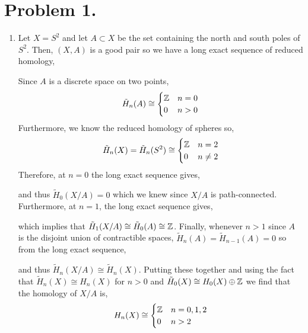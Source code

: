 \documentclass[12pt]{extarticle}
\begin{document}

\section*{Problem 1.}

\begin{enumerate}
\item Let $X = S^2$ and let $A \subset X$ be the set containing the north and south poles of $S^2$. Then, $(X, A)$ is a good pair so we  have a long exact sequence of reduced homology,
\begin{center}
\end{center} 
Since $A$ is a discrete space on two points, 
\[ \tilde{H}_n(A) \cong 
\begin{cases}
\mathbb{Z} & n = 0
\\
0 & n > 0
\end{cases} \]
Furthermore, we know the reduced homology of spheres so,
\[ \tilde{H}_n(X) = \tilde{H}_n(S^2) \cong 
\begin{cases}
\mathbb{Z} & n = 2
\\
0 & n \neq 2
\end{cases} \]
Therefore, at $n = 0$ the long exact sequence gives,
\begin{center}
\end{center}
and thus $\tilde{H}_0(X / A) = 0$ which we knew since $X/A$ is path-connected. Furthermore, at $n = 1$, the long exact sequence gives,
\begin{center}
\end{center}
which implies that $\tilde{H}_1(X/A) \cong \tilde{H}_0(A) \cong \mathbb{Z}$. Finally, whenever $n > 1$ since $A$ is the disjoint union of contractible spaces, $\tilde{H}_n(A) = \tilde{H}_{n-1}(A) = 0$ so from the long exact sequence,
\begin{center}
\end{center}
and thus $\tilde{H}_n(X/A) \cong \tilde{H}_n(X)$. Putting these together and using the fact that $\tilde{H}_n(X) \cong H_n(X)$ for $n > 0$ and $\tilde{H}_0(X) \cong H_0(X) \oplus \mathbb{Z}$ we find that the homology of $X/A$ is,
\[ H_n(X) \cong 
\begin{cases}
\mathbb{Z} & n = 0, 1, 2
\\
0 & n > 2
\end{cases} \]


\end{enumerate}
\end{document}
